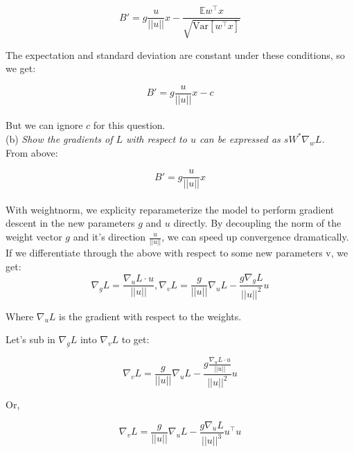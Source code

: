 \documentclass{amsart}
\theoremstyle{definition}
\theoremstyle{remark}
\numberwithin{equation}{section}
\begin{document}
\begin{equation}
B' = g \frac{u}{||u||}x - \frac{\mathbb{E}w^\top x}{\sqrt{\mathrm{Var}[w^{\top}x]}}
\end{equation}

The expectation and standard deviation are constant under these conditions, so
we get:

\begin{equation}
B' = g \frac{u}{||u||}x - c
\end{equation} \\

But we can ignore $c$ for this question. \\

(b) \textit{Show the gradients of $L$ with respect to $u$ can be expressed as
$sW^{*}\nabla_wL$.} \\

From above:

\begin{equation}
B' = g \frac{u}{||u||}x
\end{equation} \\

With weightnorm, we explicity reparameterize the model to perform gradient
descent in the new parameters $g$ and $u$ directly. By decoupling the norm of
the weight vector $g$ and it's direction $\frac{u}{||u||}$, we can speed up
convergence dramatically. \\

If we differentiate through the above with respect to some new parameters v,
we get: \\

\begin{equation}
\nabla_{g}L = \frac{\nabla_{u}L \cdot u}{||u||}, \nabla_{v}L = \frac{g}{||u||}\nabla_{u}L - \frac{g \nabla_{g}L}{||u||^{2}} u
\end{equation}

Where $\nabla_{u}L$ is the gradient with respect to the weights.

Let's sub in $\nabla_{g}L$ into $\nabla_{v}L$ to get:

\begin{equation}
\nabla_{v}L = \frac{g}{||u||}\nabla_{u}L -
    \frac{g \frac{\nabla_{u}L \cdot u}{||u||}}{||u||^{2}} u
\end{equation}

Or,

\begin{equation}
\nabla_{v}L = \frac{g}{||u||}\nabla_{u}L -
    \frac{g \nabla_{u}L}{||u||^{3}} u^\top u
\end{equation}
\end{document}
